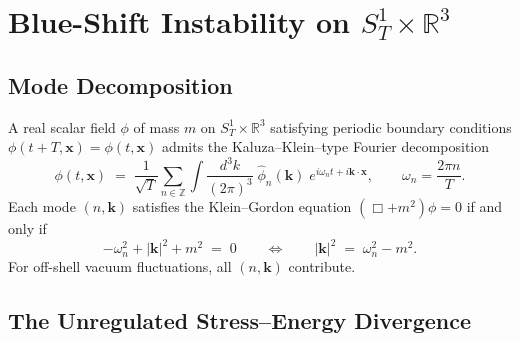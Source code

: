 \documentclass[12pt,openany]{book}
\theoremstyle{plain}
\theoremstyle{definition}
\theoremstyle{remark}
\providecommand{\abs}[1]{\lvert #1 \rvert}
\providecommand{\SoneR}{S^{1}_{T}\!\times\!\mathbb{R}^{3}}
\begin{document}
\section{Blue-Shift Instability on \texorpdfstring{$\SoneR$}{S1xR3}}
\label{sec:eft-blueshift}

\subsection{Mode Decomposition}
\label{sec:eft-modes}

A real scalar field $\phi$ of mass $m$ on $\SoneR$ satisfying periodic
boundary conditions $\phi(t+T,\mathbf{x}) = \phi(t,\mathbf{x})$
admits the Kaluza--Klein--type Fourier decomposition
\begin{equation}\label{eq:eft-mode-exp}
  \phi(t,\mathbf{x})
  \;=\;
  \frac{1}{\sqrt{T}}\sum_{n\in\mathbb{Z}}
  \int\!\frac{d^{3}k}{(2\pi)^{3}}\;
  \hat{\phi}_{n}(\mathbf{k})\;
  e^{i\omega_{n}t + i\mathbf{k}\cdot\mathbf{x}},
  \qquad
  \omega_{n}=\frac{2\pi n}{T}.
\end{equation}
Each mode $(n,\mathbf{k})$ satisfies the Klein--Gordon equation
$(\Box+m^{2})\phi=0$ if and only if
\begin{equation}\label{eq:eft-dispersion}
  -\omega_{n}^{2}+\abs{\mathbf{k}}^{2}+m^{2} \;=\; 0
  \qquad \Longleftrightarrow \qquad
  \abs{\mathbf{k}}^{2} \;=\; \omega_{n}^{2}-m^{2}.
\end{equation}
For off-shell vacuum fluctuations, all $(n,\mathbf{k})$ contribute.

\subsection{The Unregulated Stress--Energy Divergence}
\label{sec:eft-divergence}
\end{document}
